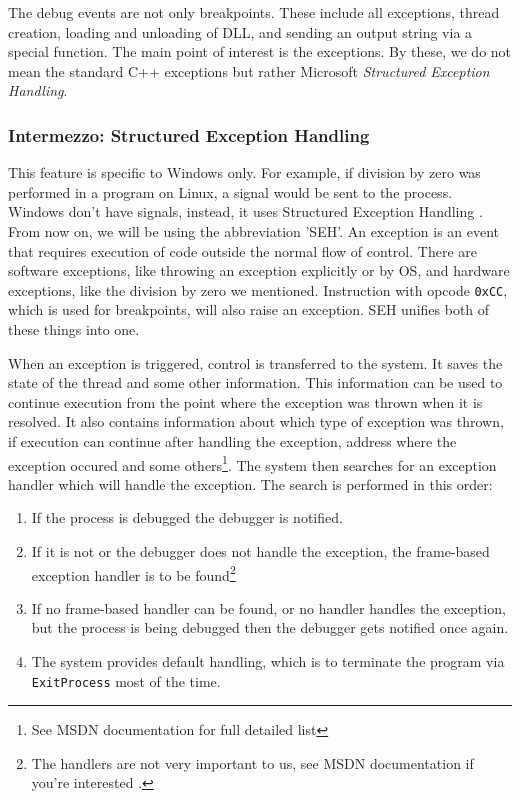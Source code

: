 The debug events are not only breakpoints. These include all exceptions, thread creation, loading and
unloading of DLL, and sending an output string via a special function. The main point of interest is the exceptions.
By these, we do not mean the standard C++ exceptions but rather Microsoft \textit{Structured Exception Handling}.

\subsubsection*{Intermezzo: Structured Exception Handling}
This feature is specific to Windows only. For example, if division by zero was performed in a program on Linux,
a signal would be sent to the process. Windows don't have signals, instead, it uses Structured Exception Handling \cite{windows-msdn-seh}. 
From now on, we will be using the abbreviation 'SEH'.
An exception is an event that requires execution of code outside the normal flow of control. There are software exceptions,
like throwing an exception explicitly or by OS, and hardware exceptions, like the division by zero we mentioned.
Instruction with opcode \lstinline{0xCC}, which is used for breakpoints, will also raise an exception. SEH unifies both of these things into one.

When an exception is triggered, control is transferred to the system. It saves the state of the thread and some other information.
This information can be used to continue execution from the point where the exception was thrown when it is resolved. It also
contains information about which type of exception was thrown, if execution can continue after handling the exception, address where the
exception occured and some others\footnote{See MSDN documentation \cite{windows-msdn-seh} for full detailed list}.
The system then searches for an exception handler which will handle the exception. The search is performed in this order:

\begin{enumerate}
    \item If the process is debugged the debugger is notified.
    \item If it is not or the debugger does not handle the exception, the frame-based exception handler is to be found\footnote{The handlers are not very important to us, see MSDN documentation if you're interested \cite{windows-msdn-seh}.}
    \item If no frame-based handler can be found, or no handler handles the exception, but the process is being debugged then the debugger gets notified once again.
    \item The system provides default handling, which is to terminate the program via \lstinline{ExitProcess} most of the time.
\end{enumerate}

